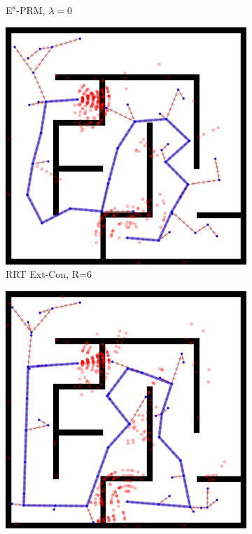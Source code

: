 \begin{figure}
\begin{subfigure}[b]{0.3\textwidth}
      \caption{E$^8$-PRM, $\lambda=0$}
   \end{subfigure}%
   \vspace{0.05in}
   \begin{subfigure}[b]{0.3\textwidth}
      \includegraphics[width=\textwidth]{figs/compare-2d-rrtc1-rrtextcon-r6-s1.png}
      \caption{RRT Ext-Con, R=6}
   \end{subfigure}%
   \quad
   \begin{subfigure}[b]{0.3\textwidth}
      \includegraphics[width=\textwidth]{figs/compare-2d-rrtc1-rrtconcon-r6-s1.png}

\end{subfigure}
\end{figure}
